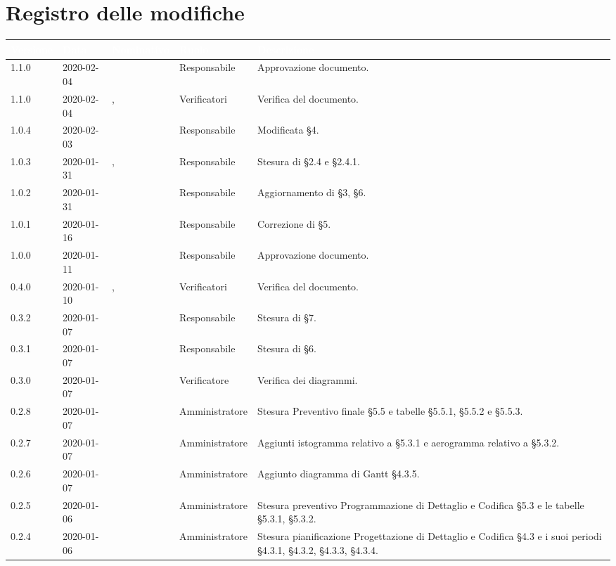\section*{Registro delle modifiche}
\setcounter{table}{-1}
{
\renewcommand{\arraystretch}{1.5}
\centering
\begin{longtable}{C{2cm} C{2cm}  C{3cm}  C{3cm} C{4.5cm}}
\textcolor{white}{\textbf{Versione}} &
\textcolor{white}{\textbf{Data}}&
\textcolor{white}{\textbf{Nominativo}}&
\textcolor{white}{\textbf{Ruolo}}&
\textcolor{white}{\textbf{Descrizione}}\\
\endhead

1.1.0 & 2020-02-04 & \MC{} & Responsabile & Approvazione documento. \\
1.1.0 & 2020-02-04 & \BR{}, \PF{} & Verificatori & Verifica del documento. \\
1.0.4 & 2020-02-03 & \MC{} & Responsabile & Modificata §4. \\
1.0.3 & 2020-01-31 & \MC{}, \AT{} & Responsabile & Stesura di §2.4 e §2.4.1. \\
1.0.2 & 2020-01-31 & \AT{} & Responsabile & Aggiornamento di §3, §6. \\
1.0.1 & 2020-01-16 & \SE{} & Responsabile & Correzione di §5. \\
1.0.0 & 2020-01-11 & \SE{} & Responsabile & Approvazione documento. \\
0.4.0 & 2020-01-10 & \AT{}, \MC{} & Verificatori & Verifica del documento. \\
0.3.2 & 2020-01-07 & \SE{} & Responsabile & Stesura di §7. \\
0.3.1 & 2020-01-07 & \SE{} & Responsabile & Stesura di §6. \\
0.3.0 & 2020-01-07 & \MC{} & Verificatore & Verifica dei diagrammi. \\
0.2.8 & 2020-01-07 & \LD{} & Amministratore & Stesura Preventivo finale §5.5 e tabelle §5.5.1, §5.5.2 e §5.5.3. \\
0.2.7 & 2020-01-07 & \LD{} & Amministratore & Aggiunti istogramma relativo a §5.3.1 e aerogramma relativo a §5.3.2. \\
0.2.6 & 2020-01-07 & \LD{} & Amministratore & Aggiunto diagramma di Gantt §4.3.5. \\
0.2.5 & 2020-01-06 & \LD{} & Amministratore & Stesura preventivo Programmazione di Dettaglio e Codifica §5.3 e le tabelle §5.3.1, §5.3.2. \\
0.2.4 & 2020-01-06 & \LD{} & Amministratore & Stesura pianificazione Progettazione di Dettaglio e Codifica §4.3 e i suoi periodi §4.3.1, §4.3.2, §4.3.3, §4.3.4. \\

\end{longtable}}
